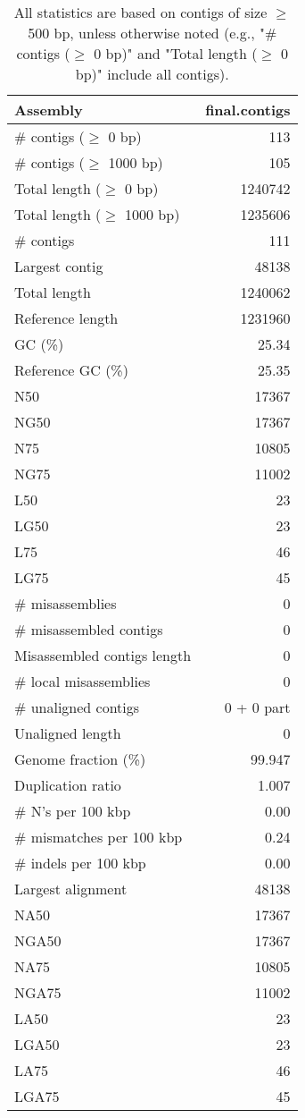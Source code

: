 \documentclass[12pt,a4paper]{article}
\begin{document}
\begin{table}[ht]
\begin{center}
\caption{All statistics are based on contigs of size $\geq$ 500 bp, unless otherwise noted (e.g., "\# contigs ($\geq$ 0 bp)" and "Total length ($\geq$ 0 bp)" include all contigs).}
\begin{tabular}{|l*{1}{|r}|}
\hline
Assembly & final.contigs \\ \hline
\# contigs ($\geq$ 0 bp) & 113 \\ \hline
\# contigs ($\geq$ 1000 bp) & 105 \\ \hline
Total length ($\geq$ 0 bp) & 1240742 \\ \hline
Total length ($\geq$ 1000 bp) & 1235606 \\ \hline
\# contigs & 111 \\ \hline
Largest contig & 48138 \\ \hline
Total length & 1240062 \\ \hline
Reference length & 1231960 \\ \hline
GC (\%) & 25.34 \\ \hline
Reference GC (\%) & 25.35 \\ \hline
N50 & 17367 \\ \hline
NG50 & 17367 \\ \hline
N75 & 10805 \\ \hline
NG75 & 11002 \\ \hline
L50 & 23 \\ \hline
LG50 & 23 \\ \hline
L75 & 46 \\ \hline
LG75 & 45 \\ \hline
\# misassemblies & 0 \\ \hline
\# misassembled contigs & 0 \\ \hline
Misassembled contigs length & 0 \\ \hline
\# local misassemblies & 0 \\ \hline
\# unaligned contigs & 0 + 0 part \\ \hline
Unaligned length & 0 \\ \hline
Genome fraction (\%) & 99.947 \\ \hline
Duplication ratio & 1.007 \\ \hline
\# N's per 100 kbp & 0.00 \\ \hline
\# mismatches per 100 kbp & 0.24 \\ \hline
\# indels per 100 kbp & 0.00 \\ \hline
Largest alignment & 48138 \\ \hline
NA50 & 17367 \\ \hline
NGA50 & 17367 \\ \hline
NA75 & 10805 \\ \hline
NGA75 & 11002 \\ \hline
LA50 & 23 \\ \hline
LGA50 & 23 \\ \hline
LA75 & 46 \\ \hline
LGA75 & 45 \\ \hline
\end{tabular}
\end{center}
\end{table}
\end{document}
